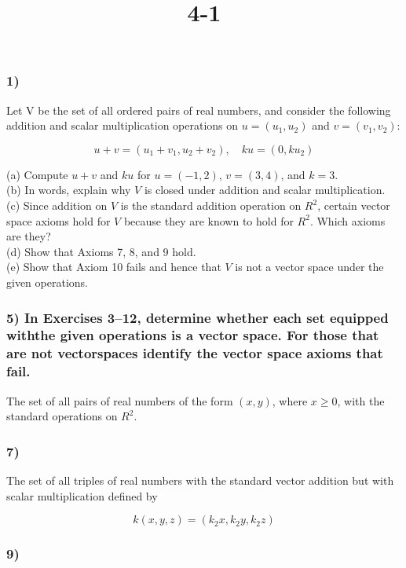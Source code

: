 \documentclass{article}
\title{ 4-1 }
\begin{document}
\maketitle
\pagebreak

\subsubsection*{ 1) }

Let V be the set of all ordered pairs of real numbers, and consider the following addition and scalar multiplication operations on $u = (u_1, u_2)$ and $v = (v_1, v_2)$:

\[ u + v = (u_1 + v_1, u_2 + v_2),\quad ku = (0, ku_2) \]

(a) Compute $u + v$ and $ku$ for $u = (-1, 2)$, $v = (3, 4)$, and $k = 3$. \\
(b) In words, explain why $V$ is closed under addition and scalar multiplication. \\
(c) Since addition on $V$ is the standard addition operation on $R^2$, certain vector space axioms hold for $V$ because they are known to hold for $R^2$. Which axioms are they? \\
(d) Show that Axioms 7, 8, and 9 hold. \\
(e) Show that Axiom 10 fails and hence that $V$ is not a vector space under the given operations. \\
\vfill

\subsubsection*{ 5) In Exercises 3–12, determine whether each set equipped withthe given operations is a vector space. For those that are not vectorspaces identify the vector space axioms that fail. }

The set of all pairs of real numbers of the form $(x, y)$, where $x \ge 0$, with the standard operations on $R^2$.
\vfill

\pagebreak
\subsubsection*{ 7) }

The set of all triples of real numbers with the standard vector addition but with scalar multiplication defined by

\[ k(x, y, z) = (k_2x, k_2y, k_2z) \]
\vfill

\subsubsection*{ 9) }
\end{document}
